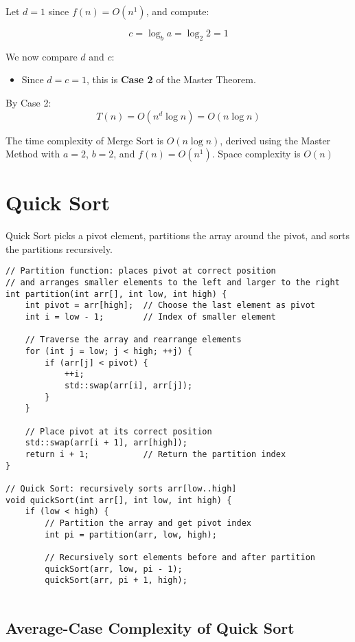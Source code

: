 \documentclass{article}
\begin{document}
Let $d = 1$ since $f(n) = O(n^1)$, and compute:

\[
c = \log_b a = \log_2 2 = 1
\]

We now compare $d$ and $c$:
\begin{itemize}
    \item Since $d = c = 1$, this is \textbf{Case 2} of the Master Theorem.
\end{itemize}

By Case 2:
\[
T(n) = O(n^d \log n) = O(n \log n)
\]

The time complexity of Merge Sort is $O(n \log n)$, derived using the Master Method with $a = 2$, $b = 2$, and $f(n) = O(n^1)$.
Space complexity is $O(n)$

\section{Quick Sort}
Quick Sort picks a pivot element, partitions the array around the pivot, and sorts the partitions recursively.

\begin{lstlisting}[style=cppstyle]
// Partition function: places pivot at correct position
// and arranges smaller elements to the left and larger to the right
int partition(int arr[], int low, int high) {
    int pivot = arr[high];  // Choose the last element as pivot
    int i = low - 1;        // Index of smaller element

    // Traverse the array and rearrange elements
    for (int j = low; j < high; ++j) {
        if (arr[j] < pivot) {
            ++i;
            std::swap(arr[i], arr[j]);
        }
    }

    // Place pivot at its correct position
    std::swap(arr[i + 1], arr[high]);
    return i + 1;           // Return the partition index
}

// Quick Sort: recursively sorts arr[low..high]
void quickSort(int arr[], int low, int high) {
    if (low < high) {
        // Partition the array and get pivot index
        int pi = partition(arr, low, high);

        // Recursively sort elements before and after partition
        quickSort(arr, low, pi - 1);
        quickSort(arr, pi + 1, high);
  
\end{lstlisting}

\subsection*{Average-Case Complexity of Quick Sort}
\end{document}

